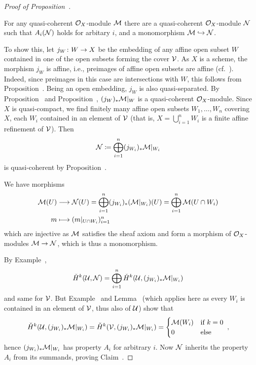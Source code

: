 \documentclass[a4paper,parskip=half,numbers=enddot, DIV=12]{scrreprt}
\begin{document}
\begin{proof}[Proof of Proposition~]
\begin{claim}
		For any quasi-coherent $\mathcal{O}_X$-module $\mathcal{M}$ there are a quasi-coherent $\mathcal{O}_X$-module $\mathcal{N}$ such that $A_i(\mathcal{N})$ holds for arbitary $i$, and a monomorphism $\Mm\monomorphism\Nn$.
	\end{claim}
	To show this, let $j_W\colon W\morphism X$ be the embedding of any affine open subset $W$ contained in one of the open subsets forming the cover $\mathcal{V}$. As $X$ is a scheme, the morphism $j_W$ is affine, i.e., preimages of affine open subsets are affine (cf.\ \cite[Definition~2.5.1]{alggeo1}). Indeed, since preimages in this case are intersections with $W$, this follows from Proposition~. Being an open embedding, $j_W$ is also quasi-separated. By Proposition~ and Proposition~, $(j_W)_*\mathcal{M}|_W$ is a quasi-coherent $\mathcal{O}_X$-module. Since $X$ is quasi-compact, we find finitely many affine open subsets $W_1,\ldots,W_n$ covering $X$, each $W_i$ contained in an element of $\mathcal{V}$ (that is, $X=\bigcup_{i=1}^nW_i$ is a finite affine refinement of $\mathcal{V}$). Then
	\begin{align*}
		\mathcal{N}\coloneqq\bigoplus_{i=1}^n(j_{W_i})_*\mathcal{M}|_{W_i}
	\end{align*}
	is quasi-coherent by Proposition~.
	
	We have morphisms
	\begin{align*}
		\Mm(U)&\morphism\Nn(U)=\bigoplus_{i=1}^n(j_{W_i})_*(\Mm|_{W_i})(U)=\bigoplus_{i=1}^n\Mm(U\cap W_i)\\
	m&\longmapsto (m|_{U\cap W_i})_{i=1}^n
	\end{align*}
	which are injective as $\mathcal{M}$ satisfies the sheaf axiom and form a morphism of $\mathcal{O}_X$-modules $\Mm\morphism\Nn$, which is thus a monomorphism.
	
	By Example~, 
	\begin{align*}
		\check{H}^k(\mathcal{U},\mathcal{N})=\bigoplus_{i=1}^n\check{H}^k(\mathcal{U},(j_{W_i})_*\mathcal{M}|_{W_i})
	\end{align*}
	and same for $\mathcal{V}$. But Example~ and  Lemma~ (which applies here as every $W_i$ is contained in an element of $\mathcal{V}$, thus also of $\mathcal{U}$) show that 
	\begin{align*}
		\check{H}^k(\mathcal{U},(j_{W_i})_*\mathcal{M}|_{W_i})=\check{H}^k(\mathcal{V},(j_{W_i})_*\mathcal{M}|_{W_i})=\begin{cases}
			\mathcal{M}(W_i) &\text{if }k=0\\
			0 & \text{else}
		\end{cases}\;,
	\end{align*}
	hence $(j_{W_i})_*\mathcal{M}|_{W_i}$ has property $A_i$ for arbitrary $i$. Now $\mathcal{N}$ inherits the property $A_i$ from its summands, proving Claim~.
		

\end{proof}
\end{document}
